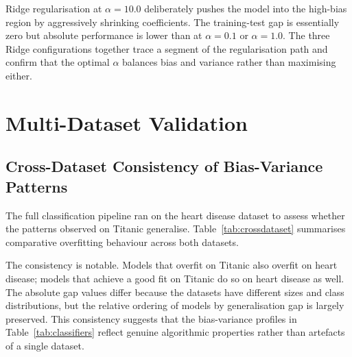 \documentclass[conference]{IEEEtran}
\begin{document}
Ridge regularisation at $\alpha = 10.0$ deliberately pushes the model into the high-bias region by aggressively shrinking coefficients. The training-test gap is essentially zero but absolute performance is lower than at $\alpha = 0.1$ or $\alpha = 1.0$. The three Ridge configurations together trace a segment of the regularisation path and confirm that the optimal $\alpha$ balances bias and variance rather than maximising either.

\section{Multi-Dataset Validation}

\subsection{Cross-Dataset Consistency of Bias-Variance Patterns}

The full classification pipeline ran on the heart disease dataset to assess whether the patterns observed on Titanic generalise. Table~\ref{tab:crossdataset} summarises comparative overfitting behaviour across both datasets.

The consistency is notable. Models that overfit on Titanic also overfit on heart disease; models that achieve a good fit on Titanic do so on heart disease as well. The absolute gap values differ because the datasets have different sizes and class distributions, but the relative ordering of models by generalisation gap is largely preserved. This consistency suggests that the bias-variance profiles in Table~\ref{tab:classifiers} reflect genuine algorithmic properties rather than artefacts of a single dataset.
\end{document}
